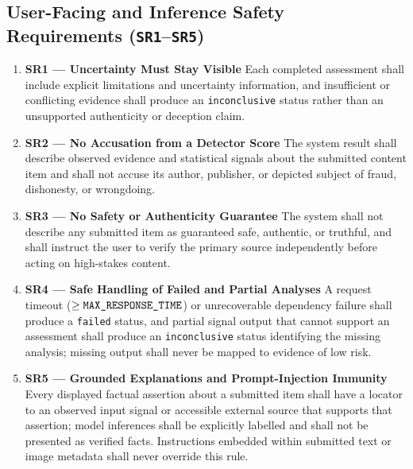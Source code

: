 \documentclass[11pt]{article}
\newcommand{\MaxResponseTime}{\texttt{MAX\_\allowbreak{}RESPONSE\_\allowbreak{}TIME}}
\begin{document}
\subsection{User-Facing and Inference Safety Requirements (\texttt{SR1}--\texttt{SR5})}

\begin{enumerate}[leftmargin=*]
    \item {}\label{SR1}\textbf{SR1 --- Uncertainty Must Stay Visible}\newline
    Each completed assessment shall include explicit limitations and uncertainty information, and insufficient or conflicting evidence shall produce an \texttt{inconclusive} status rather than an unsupported authenticity or deception claim.

    \item {}\label{SR2}\textbf{SR2 --- No Accusation from a Detector Score}\newline
    The system result shall describe observed evidence and statistical signals about the submitted content item and shall not accuse its author, publisher, or depicted subject of fraud, dishonesty, or wrongdoing.

    \item {}\label{SR3}\textbf{SR3 --- No Safety or Authenticity Guarantee}\newline
    The system shall not describe any submitted item as guaranteed safe, authentic, or truthful, and shall instruct the user to verify the primary source independently before acting on high-stakes content.

    \item {}\label{SR4}\textbf{SR4 --- Safe Handling of Failed and Partial Analyses}\newline
    A request timeout ($\ge \MaxResponseTime{}$) or unrecoverable dependency failure shall produce a \texttt{failed} status, and partial signal output that cannot support an assessment shall produce an \texttt{inconclusive} status identifying the missing analysis; missing output shall never be mapped to evidence of low risk.

    \item {}\label{SR5}\textbf{SR5 --- Grounded Explanations and Prompt-Injection Immunity}\newline
    Every displayed factual assertion about a submitted item shall have a locator to an observed input signal or accessible external source that supports that assertion; model inferences shall be explicitly labelled and shall not be presented as verified facts. Instructions embedded within submitted text or image metadata shall never override this rule.

\end{enumerate}
\end{document}

